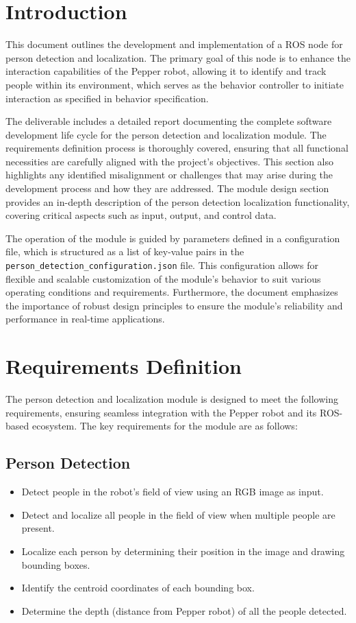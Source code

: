 \documentclass{CSSRforAfrica}
\begin{document}
\section{Introduction}
This document outlines the development and implementation of a ROS node for person detection and localization. The primary goal of this node is to enhance the interaction capabilities of the Pepper robot, allowing it to identify and track people within its environment, which serves as the behavior controller to initiate interaction as specified in behavior specification. 

The deliverable includes a detailed report documenting the complete software development life cycle for the person detection and localization module. The requirements definition process is thoroughly covered, ensuring that all functional necessities are carefully aligned with the project's objectives. This section also highlights any identified misalignment or challenges that may arise during the development process and how they are addressed. The module design section provides an in-depth description of the person detection localization functionality, covering critical aspects such as input, output, and control data.

The operation of the module is guided by parameters defined in a configuration file, which is structured as a list of key-value pairs in the \texttt{person\_detection\_configuration.json} file. This configuration allows for flexible and scalable customization of the module's behavior to suit various operating conditions and requirements. Furthermore, the document emphasizes the importance of robust design principles to ensure the module's reliability and performance in real-time applications.

\newpage

\section{Requirements Definition}
The person detection and localization module is designed to meet the following requirements, ensuring seamless integration with the Pepper robot and its ROS-based ecosystem. The key requirements for the module are as follows:
\subsection*{Person Detection}
\begin{itemize}
	\item Detect people in the robot’s field of view using an RGB image as input.
	\item Detect and localize all people in the field of view when multiple people are present.
	\item Localize each person by determining their position in the image and drawing bounding boxes.
	\item Identify the centroid coordinates of each bounding box.
	\item Determine the depth (distance from Pepper robot) of all the people detected.
\end{itemize}
\end{document}
